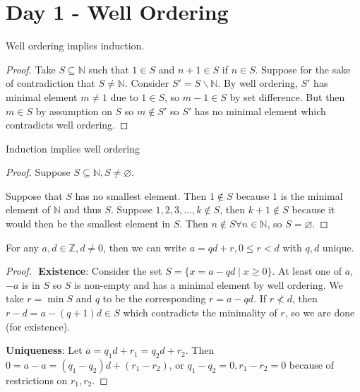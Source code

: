 \section{Day 1 - Well Ordering}

\begin{prop}
Well ordering implies induction.
\end{prop}

\begin{proof}
Take $S \subseteq \mathbb{N}$ such that $1 \in S$ and $n + 1 \in S$ if
$n \in S$. Suppose for the sake of contradiction that $S \neq
\mathbb{N}$. Consider $S' = S \backslash \mathbb{N}$. By well ordering,
$S'$ has minimal element $m \neq 1$ due to $1 \in S$, so $m - 1 \in S$
by set difference. But then $m \in S$ by assumption on $S$ so $m \not
\in S'$ so $S'$ has no minimal element which contradicts well ordering.
\end{proof}

\begin{prop}
Induction implies well ordering
\end{prop}

\begin{proof}
Suppose $S \subseteq \mathbb{N}, S \neq \varnothing$.

Suppose that $S$ has no smallest element. Then $1 \not \in S$ because
$1$ is the minimal element of $\mathbb{N}$ and thus $S$. Suppose $1, 2,
3, \dots, k \not \in S$, then $k + 1 \not \in S$ because it would then be
the smallest element in $S$. Then $n \not \in S \forall n \in
\mathbb{N}$, so $S = \varnothing$.
\end{proof}

\begin{prop}
For any $a, d \in \mathbb{Z}, d \neq 0$, then we can write $a = qd + r,
0 \leq r < d$ with $q, d$ unique.
\end{prop}

\begin{proof}
$ $\newline
\textbf{Existence}: Consider the set $S = \lbrace x = a - qd \mid x
\geq 0 \rbrace$. At least one of $a$, $-a$ is in $S$ so $S$ is non-empty
and has a minimal element by well ordering. We take $r = \min S$ and $q$
to be the corresponding $r = a - qd$. If $r \not < d$, then $r - d = a -
(q + 1)d \in S$ which contradicts the minimality of $r$, so we are done
(for existence).

\textbf{Uniqueness}: Let $a = q_1 d + r_1 = q_2 d + r_2$. Then $0 = a -
a = (q_1 - q_2) d + (r_1 - r_2)$, or $q_1 - q_2 = 0, r_1 - r_2 = 0$
because of restrictions on $r_1, r_2$.
\end{proof}
